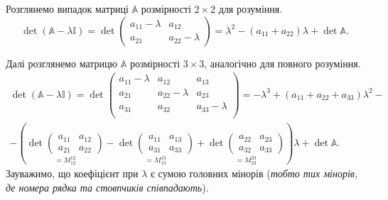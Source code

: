\documentclass{math_library}
\begin{document}
\begin{remark}
Розглянемо випадок матриці $\mathbb{A}$ розмірності $2 \times 2$ для розуміння.
\[
\det (\mathbb{A} - \lambda \mathbb{I}) = \det \begin{pmatrix}
a_{11}-\lambda & a_{12} \\
a_{21} & a_{22} - \lambda
\end{pmatrix} = \lambda^2 - (a_{11}+a_{22})\lambda + \det \mathbb{A}.
\]

Далі розглянемо матрицю $\mathbb{A}$ розмірності $3 \times 3$, аналогічно для повного розуміння.
\begin{align*}
\det (\mathbb{A} - \lambda \mathbb{I}) = \det \begin{pmatrix}
a_{11}-\lambda & a_{12} & a_{13} \\
a_{21} & a_{22}-\lambda & a_{23} \\
a_{31} & a_{32} & a_{33}-\lambda \\
\end{pmatrix} = -\lambda^3 + (a_{11}+a_{22}+a_{33})\lambda^2 - \\ - \left(\underset{=M_{12}^{12}}{\det \begin{pmatrix}
a_{11} & a_{12} \\
a_{21} & a_{22}
\end{pmatrix}} - \underset{=M_{13}^{13}}{\det \begin{pmatrix}
a_{11} & a_{13} \\
a_{31} & a_{33}
\end{pmatrix}} + \underset{=M_{23}^{23}}{\det \begin{pmatrix}
a_{22} & a_{23} \\
a_{32} & a_{33}
\end{pmatrix}} \right)\lambda + \det \mathbb{A}.
\end{align*}
Зауважимо, що коефіцієнт при $\lambda$ є сумою головних мінорів (\textit{тобто тих мінорів, де номера рядка та стовпчиків співпадають}).
\end{remark}
\end{document}
